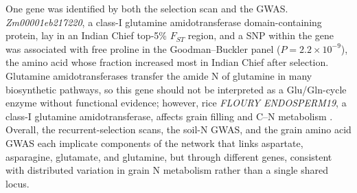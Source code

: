 One gene was identified by both the selection scan and the GWAS. \textit{Zm00001eb217220}, a class-I glutamine amidotransferase domain-containing protein, lay in an Indian Chief top-5\% $F_{ST}$ region, and a SNP within the gene was associated with free proline in the Goodman--Buckler panel ($P = 2.2 \times 10^{-9}$), the amino acid whose fraction increased most in Indian Chief after selection. Glutamine amidotransferases transfer the amide N of glutamine in many biosynthetic pathways, so this gene should not be interpreted as a Glu/Gln-cycle enzyme without functional evidence; however, rice \textit{FLOURY ENDOSPERM19}, a class-I glutamine amidotransferase, affects grain filling and C--N metabolism \citep{Lou2021FLO19}. Overall, the recurrent-selection scans, the soil-N GWAS, and the grain amino acid GWAS each implicate components of the network that links aspartate, asparagine, glutamate, and glutamine, but through different genes, consistent with distributed variation in grain N metabolism rather than a single shared locus.




